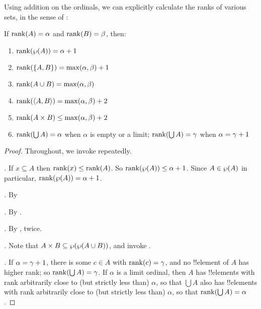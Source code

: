 \documentclass[../../../include/open-logic-section]{subfiles}
\begin{document}

Using addition on the ordinals, we can explicitly calculate the ranks
of various sets, in the sense of :

\begin{lem}
If $\mathrm{rank}(A) = \alpha$ and $\mathrm{rank}(B) = \beta$, then:
\begin{enumerate}
	\item{} $\mathrm{rank}(\wp(A)) = \alpha+ 1$
	\item{} $\mathrm{rank}(\{A, B\}) = \max(\alpha,
	\beta) + 1$
	\item{} $\mathrm{rank}(A \cup B) = \max(\alpha,
	\beta)$
	\item{} $\mathrm{rank}(\langle A,B \rangle) = \max(\alpha,
	\beta) +  2$
	\item{} $\mathrm{rank}(A \times B) \leq \max(\alpha,
	\beta) +  2$
	\item{} $\mathrm{rank}(\bigcup A) = \alpha$ when
	$\alpha$ is empty or a limit; $\mathrm{rank}(\bigcup A) = \gamma$ when
	$\alpha = \gamma+ 1$
\end{enumerate}
\end{lem}

\begin{proof}
Throughout, we invoke 
repeatedly.

\emph{.} If $x \subseteq A$ then $\mathrm{rank}(x) \leq
\mathrm{rank}(A)$. So $\mathrm{rank}(\wp(A)) \leq \alpha +  1$. Since $A
\in \wp(A)$ in particular, $\mathrm{rank}(\wp(A)) = \alpha +  1$.

\emph{.} By 

\emph{.} By .

\emph{.} By , twice.

\emph{.} Note that $A \times B \subseteq
\wp(\wp(A \cup B))$, and invoke . 

\emph{.} If $\alpha = \gamma+ 1$, there is
some $c \in A$ with $\mathrm{rank}(c) = \gamma$, and no !!{element} of $A$
has higher rank; so $\mathrm{rank}(\bigcup A) = \gamma$. If $\alpha$ is a
limit ordinal, then $A$ has !!{element}s with rank arbitrarily close
to (but strictly less than) $\alpha$, so that $\bigcup A$ also has
!!{element}s with rank arbitrarily close to (but strictly less than)
$\alpha$, so that $\mathrm{rank}(\bigcup A) = \alpha$.
\end{proof}
\end{document}
